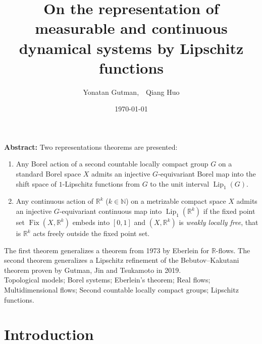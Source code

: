 \documentclass[11pt]{article}
\theoremstyle{plain}
\theoremstyle{definition}
\DeclareMathOperator{\Lip}{Lip}
\DeclareMathOperator{\Fix}{Fix}
\def\R{\mathbb{R}}
\def\N{\mathbb{N}}
\numberwithin{figure}{section}
\begin{document}
\title{{ \Large\bf{On the representation of measurable and  continuous  dynamical systems by Lipschitz functions}}
}
\author{Yonatan Gutman,\,\,\,\,  Qiang Huo
 }
\date{\today}
 \maketitle
\begin{minipage}{14cm} 

{\bf Abstract:}
Two representations theorems are presented:
\begin{enumerate}
    \item Any Borel action  of a second countable locally compact group  $G$ on a standard Borel space $X$  admits an injective $G$-equivariant Borel map into the shift space of $1$-Lipschitz functions from $G$ to the unit interval $\Lip_1(G)$. 
    \item 
    Any continuous action of $\R^k$ ($k\in \N$) on a metrizable compact space $X$  admits an injective $G$-equivariant continuous map into $\Lip_1(\R^k)$ if the fixed point set $\Fix(X,\R^k)$ embeds into $[0,1]$ and $(X,\mathbb{R}^k)$ is \textit{weakly locally free}, that is $\mathbb{R}^k$ acts freely outside the  
    fixed point set.
\end{enumerate}
 The first theorem generalizes a theorem from 1973 by Eberlein for $\mathbb{R}$-flows. The second theorem generalizes  a Lipschitz refinement of the Bebutov--Kakutani theorem proven by Gutman, Jin and Tsukamoto in 2019. \\

  Topological models; Borel systems;
  Eberlein's theorem; Real flows; Multidimensional flows; Second countable locally compact groups; Lipschitz functions. \\
\end{minipage}
 \maketitle
{}
\newtheorem{theorem}{Theorem}[section]
\newtheorem{lemma}[theorem]{Lemma}
\newtheorem{proposition}[theorem]{Proposition}
\newtheorem{corollary}[theorem]{Corollary}




\tableofcontents

\section{Introduction}
\end{document}
